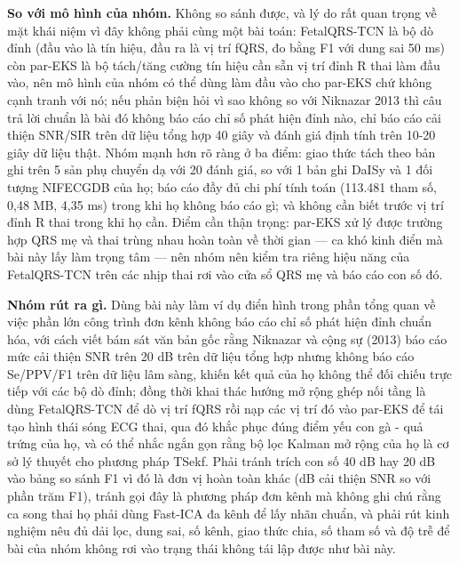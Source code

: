 \documentclass[12pt,a4paper]{article}
\begin{document}
\noindent \textbf{\color{tdtblue}So với mô hình của nhóm.} Không so sánh được, và lý do rất quan trọng về mặt khái niệm vì đây không phải cùng một bài toán: FetalQRS-TCN là bộ dò đỉnh (đầu vào là tín hiệu, đầu ra là vị trí fQRS, đo bằng F1 với dung sai 50 ms) còn par-EKS là bộ tách/tăng cường tín hiệu cần sẵn vị trí đỉnh R thai làm đầu vào, nên mô hình của nhóm có thể dùng làm đầu vào cho par-EKS chứ không cạnh tranh với nó; nếu phản biện hỏi vì sao không so với Niknazar 2013 thì câu trả lời chuẩn là bài đó không báo cáo chỉ số phát hiện đỉnh nào, chỉ báo cáo cải thiện SNR/SIR trên dữ liệu tổng hợp 40 giây và đánh giá định tính trên 10-20 giây dữ liệu thật. Nhóm mạnh hơn rõ ràng ở ba điểm: giao thức tách theo bản ghi trên 5 sản phụ chuyển dạ với 20 đánh giá, so với 1 bản ghi DaISy và 1 đối tượng NIFECGDB của họ; báo cáo đầy đủ chi phí tính toán (113.481 tham số, 0,48 MB, 4,35 ms) trong khi họ không báo cáo gì; và không cần biết trước vị trí đỉnh R thai trong khi họ cần. Điểm cần thận trọng: par-EKS xử lý được trường hợp QRS mẹ và thai trùng nhau hoàn toàn về thời gian — ca khó kinh điển mà bài này lấy làm trọng tâm — nên nhóm nên kiểm tra riêng hiệu năng của FetalQRS-TCN trên các nhịp thai rơi vào cửa sổ QRS mẹ và báo cáo con số đó.\par\vspace{3pt}
\noindent \textbf{\color{tdtblue}Nhóm rút ra gì.} Dùng bài này làm ví dụ điển hình trong phần tổng quan về việc phần lớn công trình đơn kênh không báo cáo chỉ số phát hiện đỉnh chuẩn hóa, với cách viết bám sát văn bản gốc rằng Niknazar và cộng sự (2013) báo cáo mức cải thiện SNR trên 20 dB trên dữ liệu tổng hợp nhưng không báo cáo Se/PPV/F1 trên dữ liệu lâm sàng, khiến kết quả của họ không thể đối chiếu trực tiếp với các bộ dò đỉnh; đồng thời khai thác hướng mở rộng ghép nối tầng là dùng FetalQRS-TCN để dò vị trí fQRS rồi nạp các vị trí đó vào par-EKS để tái tạo hình thái sóng ECG thai, qua đó khắc phục đúng điểm yếu con gà - quả trứng của họ, và có thể nhắc ngắn gọn rằng bộ lọc Kalman mở rộng của họ là cơ sở lý thuyết cho phương pháp TSekf. Phải tránh trích con số 40 dB hay 20 dB vào bảng so sánh F1 vì đó là đơn vị hoàn toàn khác (dB cải thiện SNR so với phần trăm F1), tránh gọi đây là phương pháp đơn kênh mà không ghi chú rằng ca song thai họ phải dùng Fast-ICA đa kênh để lấy nhãn chuẩn, và phải rút kinh nghiệm nêu đủ dải lọc, dung sai, số kênh, giao thức chia, số tham số và độ trễ để bài của nhóm không rơi vào trạng thái không tái lập được như bài này.\par\vspace{3pt}
\vspace{6pt}
\end{document}
